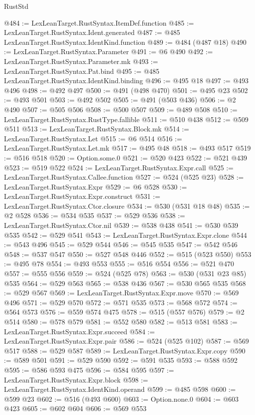 \begin{lexlean}{RustStd}
\begin{coremodule}
{\begin{coremodule}
{{{{{{{{{{{{{@484 := LexLeanTarget.RustSyntax.ItemDef.function
@485 := LexLeanTarget.RustSyntax.Ident.generated
@487 := @485 LexLeanTarget.RustSyntax.IdentKind.function
@489 := @484 (@487 @18)
@490 := LexLeanTarget.RustSyntax.Parameter
@491 := @6 @490
@492 := LexLeanTarget.RustSyntax.Parameter.mk
@493 := LexLeanTarget.RustSyntax.Pat.bind
@495 := @485 LexLeanTarget.RustSyntax.IdentKind.binding
@496 := @495 @18
@497 := @493 @496
@498 := @492 @497
@500 := @491 (@498 @470)
@501 := @495 @23
@502 := @493 @501
@503 := @492 @502
@505 := @491 (@503 @436)
@506 := @2 @490
@507 := @505 @506
@508 := @500 @507
@509 := @489 @508
@510 := LexLeanTarget.RustSyntax.RustType.fallible
@511 := @510 @438
@512 := @509 @511
@513 := LexLeanTarget.RustSyntax.Block.mk
@514 := LexLeanTarget.RustSyntax.Let
@515 := @6 @514
@516 := LexLeanTarget.RustSyntax.Let.mk
@517 := @495 @48
@518 := @493 @517
@519 := @516 @518
@520 := Option.some.{0}
@521 := @520 @423
@522 := @521 @439
@523 := @519 @522
@524 := LexLeanTarget.RustSyntax.Expr.call
@525 := LexLeanTarget.RustSyntax.Callee.function
@527 := @524 (@525 @23)
@528 := LexLeanTarget.RustSyntax.Expr
@529 := @6 @528
@530 := LexLeanTarget.RustSyntax.Expr.construct
@531 := LexLeanTarget.RustSyntax.Ctor.closure
@534 := @530 (@531 @18 @48)
@535 := @2 @528
@536 := @534 @535
@537 := @529 @536
@538 := LexLeanTarget.RustSyntax.Ctor.nil
@539 := @538 @438
@541 := @530 @539 @535
@542 := @529 @541
@543 := LexLeanTarget.RustSyntax.Expr.clone
@544 := @543 @496
@545 := @529 @544
@546 := @545 @535
@547 := @542 @546
@548 := @537 @547
@550 := @527 @548 @446
@552 := @515 (@523 @550)
@553 := @495 @78
@554 := @493 @553
@555 := @516 @554
@556 := @521 @470
@557 := @555 @556
@559 := @524 (@525 @78)
@563 := @530 (@531 @23 @85) @535
@564 := @529 @563
@565 := @538 @436
@567 := @530 @565 @535
@568 := @529 @567
@569 := LexLeanTarget.RustSyntax.Expr.move
@570 := @569 @496
@571 := @529 @570
@572 := @571 @535
@573 := @568 @572
@574 := @564 @573
@576 := @559 @574 @475
@578 := @515 (@557 @576)
@579 := @2 @514
@580 := @578 @579
@581 := @552 @580
@582 := @513 @581
@583 := LexLeanTarget.RustSyntax.Expr.succeed
@584 := LexLeanTarget.RustSyntax.Expr.pair
@586 := @524 (@525 @102)
@587 := @569 @517
@588 := @529 @587
@589 := LexLeanTarget.RustSyntax.Expr.copy
@590 := @589 @501
@591 := @529 @590
@592 := @591 @535
@593 := @588 @592
@595 := @586 @593 @475
@596 := @584 @595
@597 := LexLeanTarget.RustSyntax.Expr.block
@598 := LexLeanTarget.RustSyntax.IdentKind.operand
@599 := @485 @598
@600 := @599 @23
@602 := @516 (@493 @600)
@603 := Option.none.{0}
@604 := @603 @423
@605 := @602 @604
@606 := @569 @553
}}}}}}}}}}}}}
\end{coremodule}}
\end{coremodule}
\end{lexlean}
